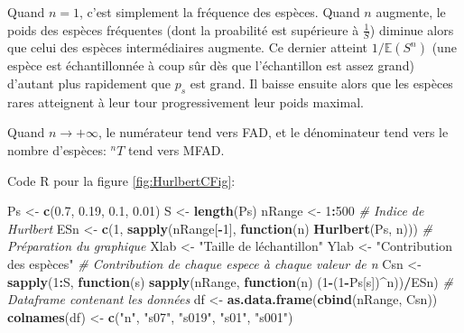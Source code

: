 \documentclass[
  11pt,
  french,
  a4paper,
  extrafontsizes,onecolumn,openright
  ]{memoir}
\newenvironment{Shaded}{\begin{snugshade}}{\end{snugshade}}
\newcommand{\CommentTok}[1]{\textcolor[rgb]{0.56,0.35,0.01}{\textit{#1}}}
\newcommand{\ControlFlowTok}[1]{\textcolor[rgb]{0.13,0.29,0.53}{\textbf{#1}}}
\newcommand{\DecValTok}[1]{\textcolor[rgb]{0.00,0.00,0.81}{#1}}
\newcommand{\FloatTok}[1]{\textcolor[rgb]{0.00,0.00,0.81}{#1}}
\newcommand{\FunctionTok}[1]{\textcolor[rgb]{0.13,0.29,0.53}{\textbf{#1}}}
\newcommand{\NormalTok}[1]{#1}
\newcommand{\OtherTok}[1]{\textcolor[rgb]{0.56,0.35,0.01}{#1}}
\newcommand{\SpecialCharTok}[1]{\textcolor[rgb]{0.81,0.36,0.00}{\textbf{#1}}}
\newcommand{\StringTok}[1]{\textcolor[rgb]{0.31,0.60,0.02}{#1}}
\begin{document}
Quand \(n=1\), c'est simplement la fréquence des espèces.
Quand \(n\) augmente, le poids des espèces fréquentes (dont la proabilité est supérieure à \(\frac{1}{S}\)) diminue alors que celui des espèces intermédiaires augmente.
Ce dernier atteint \({1}/{{\mathbb E}(S^n)}\) (une espèce est échantillonnée à coup sûr dès que l'échantillon est assez grand) d'autant plus rapidement que \(p_s\) est grand.
Il baisse ensuite alors que les espèces rares atteignent à leur tour progressivement leur poids maximal.

Quand \(n \to +\infty\), le numérateur tend vers FAD, et le dénominateur tend vers le nombre d'espèces: \(^n{T}\) tend vers MFAD.

Code R pour la figure \ref{fig:HurlbertCFig}:

\scriptsize

\begin{Shaded}
\begin{Highlighting}[]
\NormalTok{Ps }\OtherTok{\textless{}{-}} \FunctionTok{c}\NormalTok{(}\FloatTok{0.7}\NormalTok{, }\FloatTok{0.19}\NormalTok{, }\FloatTok{0.1}\NormalTok{, }\FloatTok{0.01}\NormalTok{)}
\NormalTok{S }\OtherTok{\textless{}{-}} \FunctionTok{length}\NormalTok{(Ps)}
\NormalTok{nRange }\OtherTok{\textless{}{-}} \DecValTok{1}\SpecialCharTok{:}\DecValTok{500}
\CommentTok{\# Indice de Hurlbert}
\NormalTok{ESn }\OtherTok{\textless{}{-}} \FunctionTok{c}\NormalTok{(}\DecValTok{1}\NormalTok{, }\FunctionTok{sapply}\NormalTok{(nRange[}\SpecialCharTok{{-}}\DecValTok{1}\NormalTok{], }\ControlFlowTok{function}\NormalTok{(n) }\FunctionTok{Hurlbert}\NormalTok{(Ps, n)))}
\CommentTok{\# Préparation du graphique}
\NormalTok{Xlab }\OtherTok{\textless{}{-}} \StringTok{"Taille de l\textquotesingle{}échantillon"}
\NormalTok{Ylab }\OtherTok{\textless{}{-}} \StringTok{"Contribution des espèces"}
\CommentTok{\# Contribution de chaque espece à chaque valeur de n}
\NormalTok{Csn }\OtherTok{\textless{}{-}} \FunctionTok{sapply}\NormalTok{(}\DecValTok{1}\SpecialCharTok{:}\NormalTok{S, }\ControlFlowTok{function}\NormalTok{(s) }\FunctionTok{sapply}\NormalTok{(nRange, }
              \ControlFlowTok{function}\NormalTok{(n) (}\DecValTok{1}\SpecialCharTok{{-}}\NormalTok{(}\DecValTok{1}\SpecialCharTok{{-}}\NormalTok{Ps[s])}\SpecialCharTok{\^{}}\NormalTok{n))}\SpecialCharTok{/}\NormalTok{ESn)}
\CommentTok{\# Dataframe contenant les données}
\NormalTok{df }\OtherTok{\textless{}{-}} \FunctionTok{as.data.frame}\NormalTok{(}\FunctionTok{cbind}\NormalTok{(nRange, Csn))}
\FunctionTok{colnames}\NormalTok{(df) }\OtherTok{\textless{}{-}} \FunctionTok{c}\NormalTok{(}\StringTok{"n"}\NormalTok{, }\StringTok{"s07"}\NormalTok{, }\StringTok{"s019"}\NormalTok{, }\StringTok{"s01"}\NormalTok{, }\StringTok{"s001"}\NormalTok{)}

\end{Highlighting}
\end{Shaded}
\end{document}
